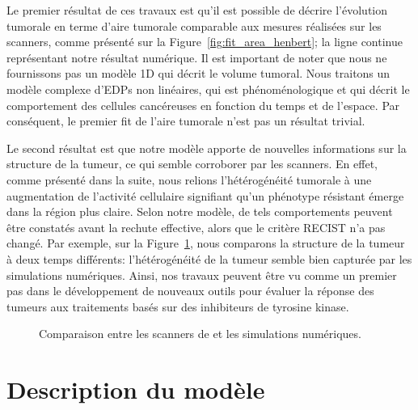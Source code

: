 \documentclass[main.tex]{subfiles}
\begin{document}
Le premier résultat de ces travaux est qu'il est possible de décrire l'évolution tumorale en terme d'aire tumorale comparable aux mesures réalisées sur les scanners, comme présenté sur la  Figure~\ref{fig:fit_area_henbert}; la ligne continue représentant notre résultat numérique. Il est important de noter que nous ne fournissons pas un modèle 1D qui décrit le volume tumoral. Nous traitons un modèle complexe d'EDPs non linéaires, qui est phénoménologique et qui décrit le comportement des cellules cancéreuses en fonction du temps et de l'espace. Par conséquent, le premier fit de l'aire tumorale n'est pas un résultat trivial.


Le second résultat est que notre modèle apporte de nouvelles informations sur la structure de la tumeur, ce qui semble corroborer par les scanners. En effet, comme présenté dans la suite, nous relions l'hétérogénéité tumorale à une augmentation de l'activité cellulaire signifiant qu'un phénotype résistant émerge dans la région plus claire. Selon notre modèle, de tels comportements peuvent être constatés avant la rechute effective, alors que le critère RECIST n'a pas changé. Par exemple, sur la Figure~\ref{fig:compare_spatial_nber}, 
nous comparons la structure de la tumeur à deux temps différents: l'hétérogénéité de la tumeur semble bien capturée par les simulations numériques. Ainsi, nos travaux peuvent être vu comme un premier pas dans le développement de nouveaux outils pour évaluer la réponse des tumeurs aux traitements  basés sur des inhibiteurs de tyrosine kinase.

\begin{figure}[htpb]
\vspace{-1cm}
\caption{\label{fig:compare_spatial_nber}
Comparaison entre les scanners de \Nber et les simulations numériques.
}
\end{figure}
\section{Description du modèle}
\end{document}
